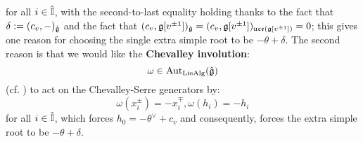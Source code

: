         for all $i \in \hat{\mathbb{I}}$, with the second-to-last equality holding thanks to the fact that $\delta := (c_v, -)_{\hat{\mathfrak{g}}}$ and the fact that $(c_v, \mathfrak{g}[v^{\pm 1}])_{\hat{\mathfrak{g}}} = (c_v, \mathfrak{g}[v^{\pm 1}])_{\mathfrak{uce}(\mathfrak{g}[v^{\pm 1}])} = 0$; this gives one reason for choosing the single extra simple root to be $-\theta + \delta$. The second reason is that we would like the \textbf{Chevalley involution}:
            $$\omega \in \mathrm{Aut}_{\mathrm{Lie}\mathrm{Alg}}(\hat{\mathfrak{g}})$$
        (cf. \cite[p. 7]{kac_infinite_dimensional_lie_algebras}) to act on the Chevalley-Serre generators by:
            $$\omega(x_i^{\pm}) = -x_i^{\mp}, \omega(h_i) = -h_i$$
        for all $i \in \hat{\mathbb{I}}$, which forces $h_0 = -\theta^{\vee} + c_v$ and consequently, forces the extra simple root to be $-\theta + \delta$.
        
